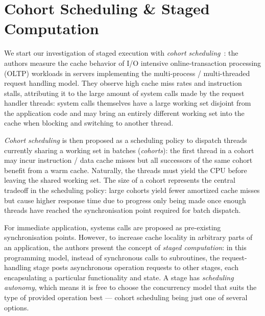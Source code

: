 \documentclass[12pt,a4paper]{book}
\begin{document}
\section{Cohort Scheduling \& Staged Computation}\label{ch:relwork:cohort}
We start our investigation of staged execution with \emph{cohort scheduling}~\cite{cohort}:
the authors measure the cache behavior of I/O intensive online-transaction processing (OLTP) workloads in servers implementing the multi-process / multi-threaded request handling model.
They observe high cache miss rates and instruction stalls, attributing it to the large amount of system calls made by the request handler threads:
system calls themselves have a large working set disjoint from the application code and may bring an entirely different working set into the cache when blocking and switching to another thread.

\emph{Cohort scheduling} is then proposed as a scheduling policy to dispatch threads currently sharing a working set in batches (\emph{cohorts}):
the first thread in a cohort may incur instruction / data cache misses but all successors of the same cohort benefit from a warm cache.
Naturally, the threads must yield the CPU before leaving the shared working set.
The size of a cohort represents the central tradeoff in the scheduling policy: large cohorts yield fewer amortized cache misses but cause higher response time due to progress only being made once enough threads have reached the synchronisation point required for batch dispatch.

For immediate application, systems calls are proposed as pre-existing synchronisation points.
However, to increase cache locality in arbitrary parts of an application, the authors present the concept of \emph{staged computation}:
in this programming model, instead of synchronous calls to subroutines, the request-handling stage posts asynchronous operation requests to other stages, each encapsulating a particular functionality and state.
A stage has \emph{scheduling autonomy}, which means it is free to choose the concurrency model that suits the type of provided operation best --- cohort scheduling being just one of several options.
\end{document}

